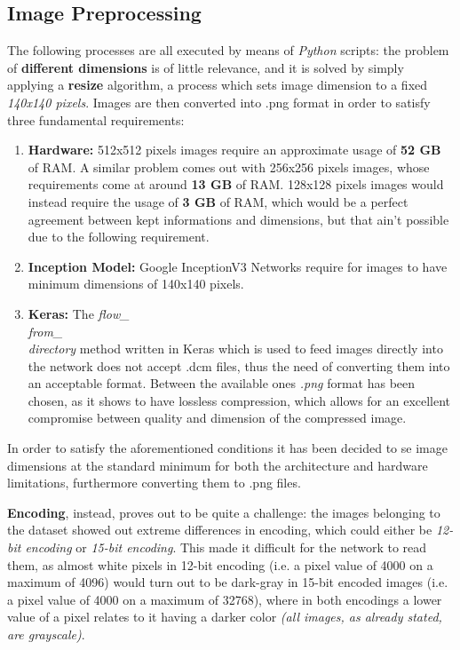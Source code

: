 \documentclass[../main.tex]{subfiles}
\begin{document}
\subsection{Image Preprocessing}
The following processes are all executed by means of \textit{Python} scripts: the problem of \textbf{different dimensions} is of little relevance, and it is solved by simply applying a \textbf{resize} algorithm, a process which sets image dimension to a fixed \textit{140x140 pixels}. Images are then converted into .png format in order to satisfy three fundamental requirements:
\begin{enumerate}
	\item \textbf{Hardware:} 512x512 pixels images require an approximate usage of \textbf{52 GB} of RAM. A similar problem comes out with 256x256 pixels images, whose requirements come at around \textbf{13 GB} of RAM. 128x128 pixels images would instead require the usage of \textbf{3 GB} of RAM, which would be a perfect agreement between kept informations and dimensions, but that ain't possible due to the following requirement.
	\item \textbf{Inception Model:} Google InceptionV3 Networks require for images to have minimum dimensions of 140x140 pixels.
	\item \textbf{Keras:} The \textit{flow\_\\from\_\\directory} method written in Keras which is used to feed images directly into the network does not accept .dcm files, thus the need of converting them into an acceptable format. Between the available ones \textit{.png} format has been chosen, as it shows to have lossless compression, which allows for an excellent compromise between quality and dimension of the compressed image.
\end{enumerate}
In order to satisfy the aforementioned conditions it has been decided to se image dimensions at the standard minimum for both the architecture and hardware limitations, furthermore converting them to .png files.

\textbf{Encoding}, instead, proves out to be quite a challenge: the images belonging to the dataset showed out extreme differences in encoding, which could either be \textit{12-bit encoding} or \textit{15-bit encoding}. This made it difficult for the network to read them, as almost white pixels in 12-bit encoding (i.e. a pixel value of 4000 on a maximum of 4096) would turn out to be dark-gray in 15-bit encoded images (i.e. a pixel value of 4000 on a maximum of 32768), where in both encodings a lower value of a pixel relates to it having a darker color \textit{(all images, as already stated, are grayscale)}.
\vspace{5mm}
\end{document}
